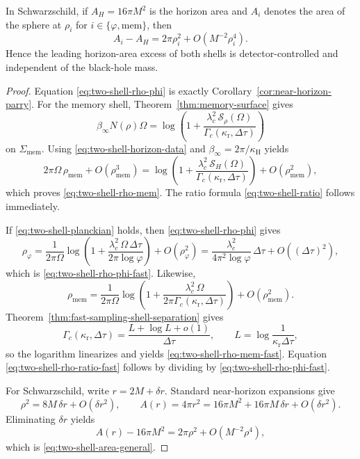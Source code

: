 \begin{theorem}
In Schwarzschild, if $A_H=16\pi M^2$ is the horizon area and $A_i$ denotes the area of the sphere at $\rho_i$ for $i\in\{\varphi,\mathrm{mem}\}$, then
\begin{equation}\label{eq:two-shell-area-general}
A_i-A_H
=
2\pi\rho_i^2+O(M^{-2}\rho_i^4).
\end{equation}
Hence the leading horizon-area excess of both shells is detector-controlled and independent of the black-hole mass.
\end{theorem}

\begin{proof}
Equation \eqref{eq:two-shell-rho-phi} is exactly Corollary~\ref{cor:near-horizon-parry}. For the memory shell, Theorem~\ref{thm:memory-surface} gives
\[
\beta_\infty N(\rho)\Omega
=
\log\!\left(
1+\frac{\lambda_c^2\,\mathcal S_\rho(\Omega)}{\Gamma_c(\kappa_{\mathrm r},\Delta\tau)}
\right)
\]
on $\Sigma_{\mathrm{mem}}$. Using \eqref{eq:two-shell-horizon-data} and $\beta_\infty=2\pi/\kappa_{\mathrm H}$ yields
\[
2\pi\Omega\,\rho_{\mathrm{mem}}+O(\rho_{\mathrm{mem}}^3)
=
\log\!\left(
1+\frac{\lambda_c^2\,\mathcal S_H(\Omega)}{\Gamma_c(\kappa_{\mathrm r},\Delta\tau)}
\right)
+O(\rho_{\mathrm{mem}}^2),
\]
which proves \eqref{eq:two-shell-rho-mem}. The ratio formula \eqref{eq:two-shell-ratio} follows immediately.

If \eqref{eq:two-shell-planckian} holds, then \eqref{eq:two-shell-rho-phi} gives
\[
\rho_\varphi
=
\frac{1}{2\pi\Omega}
\log\!\left(
1+\frac{\lambda_c^2\,\Omega\,\Delta\tau}{2\pi\log\varphi}
\right)
+O(\rho_\varphi^2)
=
\frac{\lambda_c^2}{4\pi^2\log\varphi}\,\Delta\tau+O((\Delta\tau)^2),
\]
which is \eqref{eq:two-shell-rho-phi-fast}. Likewise,
\[
\rho_{\mathrm{mem}}
=
\frac{1}{2\pi\Omega}
\log\!\left(
1+\frac{\lambda_c^2\,\Omega}{2\pi\Gamma_c(\kappa_{\mathrm r},\Delta\tau)}
\right)
+O(\rho_{\mathrm{mem}}^2).
\]
Theorem~\ref{thm:fast-sampling-shell-separation} gives
\[
\Gamma_c(\kappa_{\mathrm r},\Delta\tau)
=
\frac{L+\log L+o(1)}{\Delta\tau},
\qquad
L=\log\frac{1}{\kappa_{\mathrm r}\Delta\tau},
\]
so the logarithm linearizes and yields \eqref{eq:two-shell-rho-mem-fast}. Equation \eqref{eq:two-shell-rho-ratio-fast} follows by dividing by \eqref{eq:two-shell-rho-phi-fast}.

For Schwarzschild, write $r=2M+\delta r$. Standard near-horizon expansions give
\[
\rho^2=8M\,\delta r+O(\delta r^2),
\qquad
A(r)=4\pi r^2=16\pi M^2+16\pi M\,\delta r+O(\delta r^2).
\]
Eliminating $\delta r$ yields
\[
A(r)-16\pi M^2
=
2\pi\rho^2+O(M^{-2}\rho^4),
\]
which is \eqref{eq:two-shell-area-general}.
\end{proof}

